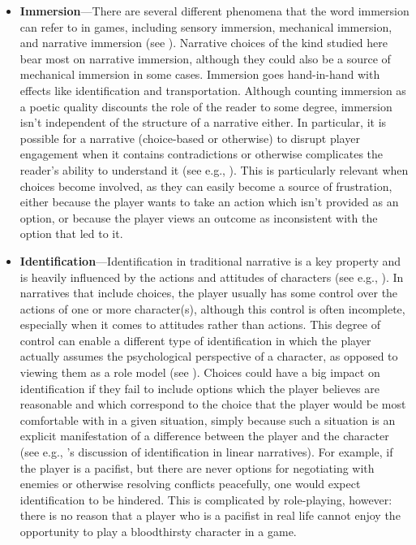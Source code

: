 \begin{itemize}
\item \textbf{Immersion}---There are several different phenomena that the word immersion can refer to in games, including sensory immersion, mechanical immersion, and narrative immersion (see \citep{Ermi2005}).
%
Narrative choices of the kind studied here bear most on narrative immersion, although they could also be a source of mechanical immersion in some cases.
%
Immersion goes hand-in-hand with effects like identification and transportation.
%
Although counting immersion as a poetic quality discounts the role of the reader to some degree, immersion isn't independent of the structure of a narrative either.
%
In particular, it is possible for a narrative (choice-based or otherwise) to disrupt player engagement when it contains contradictions or otherwise complicates the reader's ability to understand it (see e.g., \citep{Douglas2001}).
%
This is particularly relevant when choices become involved, as they can easily become a source of frustration, either because the player wants to take an action which isn't provided as an option, or because the player views an outcome as inconsistent with the option that led to it.


\item \textbf{Identification}---Identification in traditional narrative is a key property and is heavily influenced by the actions and attitudes of characters (see e.g., \citep{Feilitzen1975,Oatley1995}).
%
In narratives that include choices, the player usually has some control over the actions of one or more character(s), although this control is often incomplete, especially when it comes to attitudes rather than actions.
%
This degree of control can enable a different type of identification in which the player actually assumes the psychological perspective of a character, as opposed to viewing them as a role model (see \citep{Klimmt2009}).
%
Choices could have a big impact on identification if they fail to include options which the player believes are reasonable and which correspond to the choice that the player would be most comfortable with in a given situation, simply because such a situation is an explicit manifestation of a difference between the player and the character (see e.g., \citep{Busselle2009}'s discussion of identification in linear narratives).
%
For example, if the player is a pacifist, but there are never options for negotiating with enemies or otherwise resolving conflicts peacefully, one would expect identification to be hindered.
%
This is complicated by role-playing, however: there is no reason that a player who is a pacifist in real life cannot enjoy the opportunity to play a bloodthirsty character in a game.



\end{itemize}
